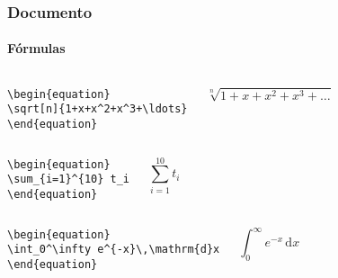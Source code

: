\begin{frame}[fragile]
\frametitle{Documento}
\framesubtitle{Fórmulas}
  \scriptsize
  \begin{columns}[c]
  \begin{verbatim}
\begin{equation}
\sqrt[n]{1+x+x^2+x^3+\ldots}
\end{equation}
  \end{verbatim}
  \begin{fmpage}{\textwidth}
\begin{equation}
\sqrt[n]{1+x+x^2+x^3+\ldots}
\end{equation}
  \end{fmpage}
  \end{columns}

  \begin{columns}[c]
  \begin{verbatim}
\begin{equation}
\sum_{i=1}^{10} t_i
\end{equation}
  \end{verbatim}
  \begin{fmpage}{\textwidth}
\begin{equation}
\sum_{i=1}^{10} t_i
\end{equation}
  \end{fmpage}
  \end{columns}

  \begin{columns}[c]
  \begin{verbatim}
\begin{equation}
\int_0^\infty e^{-x}\,\mathrm{d}x
\end{equation}
  \end{verbatim}
  \begin{fmpage}{\textwidth}
\begin{equation}
\int_0^\infty e^{-x}\,\mathrm{d}x
\end{equation}
  \end{fmpage}
  \end{columns}
\end{frame}


